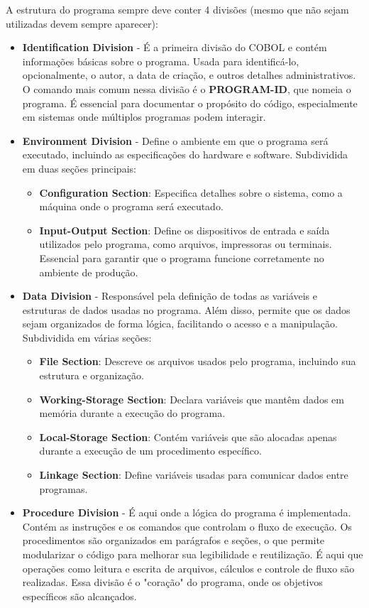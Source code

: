 A estrutura do programa sempre deve conter 4 divisões (mesmo que não sejam utilizadas devem sempre aparecer):
\begin{itemize}
	\item \textbf{Identification Division} - É a primeira divisão do COBOL e contém informações básicas sobre o programa. Usada para identificá-lo, opcionalmente, o autor, a data de criação, e outros detalhes administrativos. O comando mais comum nessa divisão é o \textbf{PROGRAM-ID}, que nomeia o programa. É essencial para documentar o propósito do código, especialmente em sistemas onde múltiplos programas podem interagir.
	\item \textbf{Environment Division} - Define o ambiente em que o programa será executado, incluindo as especificações do hardware e software. Subdividida em duas seções principais:
	\begin{itemize}
		\item \textbf{Configuration Section}: Especifica detalhes sobre o sistema, como a máquina onde o programa será executado.
		\item \textbf{Input-Output Section}: Define os dispositivos de entrada e saída utilizados pelo programa, como arquivos, impressoras ou terminais. Essencial para garantir que o programa funcione corretamente no ambiente de produção.
	\end{itemize}	
	\item \textbf{Data Division} - Responsável pela definição de todas as variáveis e estruturas de dados usadas no programa. Além disso, permite que os dados sejam organizados de forma lógica, facilitando o acesso e a manipulação. Subdividida em várias seções:
	\begin{itemize}
		\item \textbf{File Section}: Descreve os arquivos usados pelo programa, incluindo sua estrutura e organização.
		\item \textbf{Working-Storage Section}: Declara variáveis que mantêm dados em memória durante a execução do programa.
		\item \textbf{Local-Storage Section}: Contém variáveis que são alocadas apenas durante a execução de um procedimento específico.
		\item \textbf{Linkage Section}: Define variáveis usadas para comunicar dados entre programas.
	\end{itemize}
	\item \textbf{Procedure Division} - É aqui onde a lógica do programa é implementada. Contém as instruções e os comandos que controlam o fluxo de execução. Os procedimentos são organizados em parágrafos e seções, o que permite modularizar o código para melhorar sua legibilidade e reutilização. É aqui que operações como leitura e escrita de arquivos, cálculos e controle de fluxo são realizadas. Essa divisão é o "coração" do programa, onde os objetivos específicos são alcançados.
\end{itemize}

